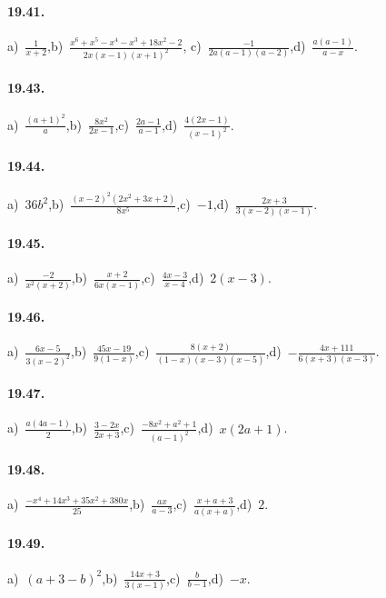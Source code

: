 \paragraph{19.41.}
a)~$\frac{1}{x+2}$,\quad b)~$\frac{x^{6}+x^{5}-x^{4}-x^{3}+18x^{2}-2}{2x(x-1)(x+1)^{2}}$, \quad c)~$\frac{-1}{2a(a-1)(a-2)}$,\quad d)~$\frac{a(a-1)}{a-x}$.

\paragraph{19.43.}
a)~$\frac{(a+1)^{2}}{a}$,\quad b)~$\frac{8x^{2}}{2x-1}$,\quad c)~$\frac{2a-1}{a-1}$,\quad d)~$\frac{4(2x-1)}{(x-1)^{2}}$.

\paragraph{19.44.}
a)~$36b^{2}$,\quad b)~$\frac{(x-2)^{2}(2x^{2}+3x+2)}{8x^{5}}$,\quad c)~$-1$,\quad d)~$\frac{2x+3}{3(x-2)(x-1)}$.

\paragraph{19.45.}
a)~$\frac{-2}{x^{2}(x+2)}$,\quad b)~$\frac{x+2}{6x(x-1)}$,\quad c)~$\frac{4x-3}{x-4}$,\quad d)~$2(x-3)$.

\paragraph{19.46.}
a)~$\frac{6x-5}{3(x-2)^{2}}$,\quad b)~$\frac{45x-19}{9(1-x)}$,\quad c)~$\frac{8(x+2)}{(1-x)(x-3)(x-5)}$,\quad d)~$-\frac{4x+111}{6(x+3)(x-3)}$.

\paragraph{19.47.}
a)~$\frac{a(4a-1)}{2}$,\quad b)~$\frac{3-2x}{2x+3}$,\quad c)~$\frac{-8x^2+a^2+1}{(a-1)^2}$,\quad d)~$x(2a+1)$.

\paragraph{19.48.}
a)~$\frac{-x^4+14x^3+35x^2+380x}{25}$,\quad b)~$\frac{ax}{a-3}$,\quad c)~$\frac{x+a+3}{a(x+a)}$,\quad d)~$2$.

\paragraph{19.49.}
a)~$(a+3-b)^{2}$,\quad b)~$\frac{14x+3}{3(x-1)}$,\quad c)~$\frac{b}{b-1}$,\quad d)~$-x$.

